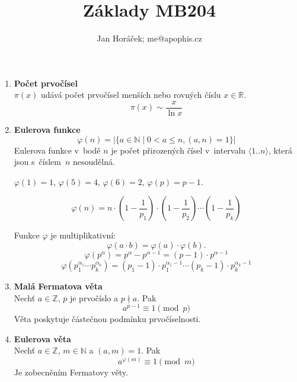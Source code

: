 \documentclass[12pt,a4paper]{article}
\begin{document}
\title{Základy MB204}
\author{Jan Horáček; me@apophis.cz}
\maketitle

\begin{enumerate}
	\item \textbf{Počet prvočísel}\\
		$\pi(x)$ udává počet prvočísel menších nebo rovných číslu $x \in \mathbb{R}$. \\
		\[ \pi(x) \sim \frac{x}{\ln{x}} \]


	\item \textbf{Eulerova funkce}
		\[ \varphi(n) = |\{ a \in \mathbb{N} \mid 0 < a \le n, (a,n) = 1\}| \]
		Eulerova funkce v~bodě $n$ je počet přirozených čísel v~intervalu
		$\langle 1..n \rangle$, která jsou s~číslem~$n$ nesoudělná.

		$\varphi(1) = 1$, $\varphi(5) = 4$, $\varphi(6) = 2$, $\varphi(p) = p-1$.

		\[ \varphi(n) = n \cdot \left( 1 - \frac{1}{p_1} \right) \cdot
			\left( 1 - \frac{1}{p_2} \right) \cdots \left( 1 - \frac{1}{p_k} \right) \]

		Funkce $\varphi$ je multiplikativní:
		\[ \varphi(a \cdot b) = \varphi(a) \cdot \varphi(b). \]
		\[ \varphi(p^\alpha) = p^\alpha - p^{\alpha-1} = (p - 1) \cdot p^{\alpha-1}\]
		\[ \varphi(p_1^{\alpha_1} \cdots p_k^{\alpha_k}) = (p_1 - 1) \cdot
			p_1^{\alpha_1-1} \cdots (p_k - 1) \cdot p_k^{\alpha_k-1} \]

	\item \textbf{Malá Fermatova věta}\\
		Nechť $a \in \mathbb{Z}$, $p$ je prvočíslo a $p \nmid a$. Pak
		\[ a^{p-1} \equiv 1 \pmod{p} \]
		Věta poskytuje částečnou podmínku prvočíselnosti.

	\item \textbf{Eulerova věta}\\
		Nechť $a \in \mathbb{Z}$, $m \in \mathbb{N}$ a $(a,m) = 1$. Pak
		\[ a^{\varphi(m)} \equiv 1 \pmod{m} \]
		Je zobecněním Fermatovy věty.


\end{enumerate}
\end{document}
